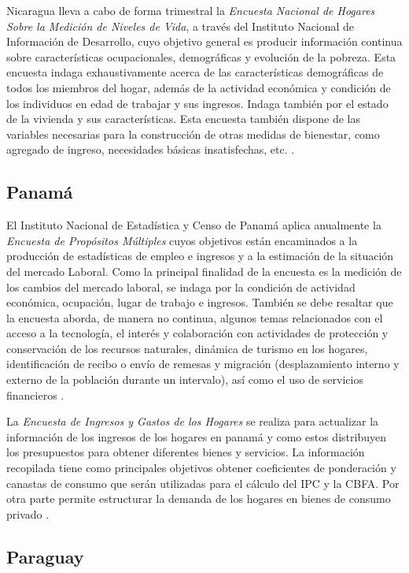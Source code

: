 Nicaragua lleva a cabo de forma trimestral la \emph{Encuesta Nacional de Hogares Sobre la Medición de Niveles de Vida}, a través del Instituto Nacional de Información de Desarrollo, cuyo objetivo general es producir información continua sobre características ocupacionales, demográficas y evolución de la pobreza. Esta encuesta indaga exhaustivamente acerca de las características demográficas de todos los miembros del hogar, además de la actividad económica y condición de los individuos en edad de trabajar y sus ingresos. Indaga también por el estado de la vivienda y sus características. Esta encuesta también dispone de las variables necesarias para la construcción de otras medidas de bienestar, como agregado de ingreso, necesidades básicas insatisfechas, etc. \citep{INIDE-NI}.

\hypertarget{panama}{%
\subsection*{Panamá}\label{panama}}


El Instituto Nacional de Estadística y Censo de Panamá aplica anualmente la \emph{Encuesta de Propósitos Múltiples} cuyos objetivos están encaminados a la producción de estadísticas de empleo e ingresos y a la estimación de la situación del mercado Laboral. Como la principal finalidad de la encuesta es la medición de los cambios del mercado laboral, se indaga por la condición de actividad económica, ocupación, lugar de trabajo e ingresos. También se debe resaltar que la encuesta aborda, de manera no continua, algunos temas relacionados con el acceso a la tecnología, el interés y colaboración con actividades de protección y conservación de los recursos naturales, dinámica de turismo en los hogares, identificación de recibo o envío de remesas y migración (desplazamiento interno y externo de la población durante un intervalo), así como el uso de servicios financieros \citep{INEC-PA}.

La \emph{Encuesta de Ingresos y Gastos de los Hogares} se realiza para actualizar la información de los ingresos de los hogares en panamá y como estos distribuyen los presupuestos para obtener diferentes bienes y servicios. La información recopilada tiene como principales objetivos obtener coeficientes de ponderación y canastas de consumo que serán utilizadas para el cálculo del IPC y la CBFA. Por otra parte permite estructurar la demanda de los hogares en bienes de consumo privado \citep{INEC2-PA}.

\hypertarget{paraguay}{%
\subsection*{Paraguay}\label{paraguay}}


